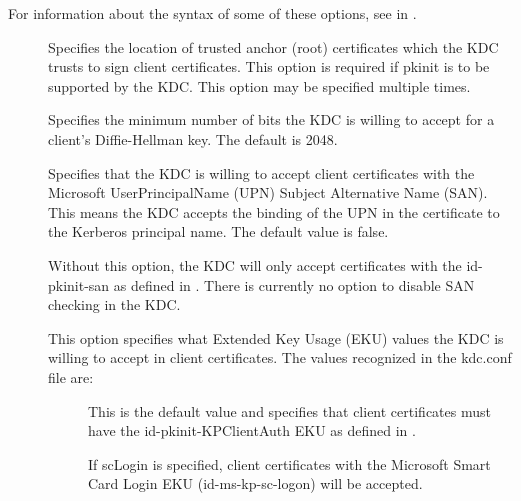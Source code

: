 \documentclass[letterpaper,10pt,english]{sphinxmanual}
\begin{document}
For information about the syntax of some of these options, see
{\hyperref[\detokenize{admin/conf_files/krb5_conf:pkinit-identity}]{}} in
{\hyperref[\detokenize{admin/conf_files/krb5_conf:krb5-conf-5}]{}}.
\begin{description}
\item[{}] \leavevmode
Specifies the location of trusted anchor (root) certificates which
the KDC trusts to sign client certificates.  This option is
required if pkinit is to be supported by the KDC.  This option may
be specified multiple times.

\item[{}] \leavevmode
Specifies the minimum number of bits the KDC is willing to accept
for a client’s Diffie-Hellman key.  The default is 2048.

\item[{}] \leavevmode
Specifies that the KDC is willing to accept client certificates
with the Microsoft UserPrincipalName (UPN) Subject Alternative
Name (SAN).  This means the KDC accepts the binding of the UPN in
the certificate to the Kerberos principal name.  The default value
is false.

Without this option, the KDC will only accept certificates with
the id-pkinit-san as defined in .  There is currently
no option to disable SAN checking in the KDC.

\item[{}] \leavevmode
This option specifies what Extended Key Usage (EKU) values the KDC
is willing to accept in client certificates.  The values
recognized in the kdc.conf file are:
\begin{description}
\item[{}] \leavevmode
This is the default value and specifies that client
certificates must have the id-pkinit-KPClientAuth EKU as
defined in .

\item[{}] \leavevmode
If scLogin is specified, client certificates with the
Microsoft Smart Card Login EKU (id-ms-kp-sc-logon) will be
accepted.


\end{description}
\end{description}
\end{document}
